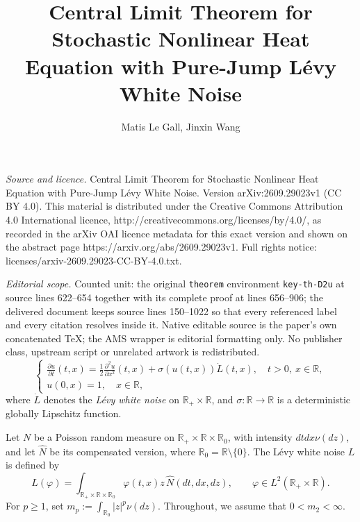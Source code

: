 \documentclass[10pt,a4paper]{amsart}
\def\bR{\mathbb{R}}
\begin{document}
\title[Central Limit Theorem for Stochastic Nonlinear Heat Equation]{Central Limit Theorem for Stochastic Nonlinear Heat Equation with Pure-Jump L\'evy White Noise}
\author{Matis Le Gall, Jinxin Wang}
\date{}
\maketitle
\noindent\emph{Source and licence.} Central Limit Theorem for Stochastic Nonlinear Heat Equation with Pure-Jump L\'evy White Noise. Version arXiv:2609.29023v1 (CC BY 4.0). This material is distributed under the Creative Commons Attribution 4.0 International licence, http://creativecommons.org/licenses/by/4.0/, as recorded in the arXiv OAI licence metadata for this exact version and shown on the abstract page https://arxiv.org/abs/2609.29023v1. Full rights notice: licenses/arxiv-2609.29023-CC-BY-4.0.txt.\par\smallskip
\noindent\textit{Editorial scope.} Counted unit: the original \texttt{theorem} environment \texttt{key-th-D2u} at source lines 622--654 together with its complete proof at lines 656--906; the delivered document keeps source lines 150--1022 so that every referenced label and every citation resolves inside it. Native editable source is the paper's own concatenated TeX; the AMS wrapper is editorial formatting only. No publisher class, upstream script or unrelated artwork is redistributed.
\begin{equation}
\label{nonlinear}
\begin{cases}
\displaystyle
\frac{\partial u}{\partial t}(t,x)
=
\frac{1}{2}\frac{\partial^2 u}{\partial x^2}(t,x)
+\sigma(u(t,x))\dot L(t,x),
\quad t>0,\ x\in\bR,\\[0.3em]
u(0,x)=1,\quad x\in\bR,
\end{cases}
\end{equation}
where $\dot L$ denotes the {\em L\'evy white noise} on
$\bR_+\times\bR$, and $\sigma:\bR\to\bR$ is a deterministic globally
Lipschitz function.


\medskip


 Let $N$ be a Poisson random measure on
$\bR_+\times\bR\times\bR_0$, with intensity $dtdx\nu(dz)$, and let
$\widehat N$ be its compensated version, where $\bR_0=\bR\setminus\{0\}$.
The L\'evy white noise $L$ is defined by
\begin{equation}
\label{def-L}
L(\varphi)
=
\int_{\bR_+\times\bR\times\bR_0}
\varphi(t,x)z\,
\widehat N(dt,dx,dz),
\qquad
\varphi\in L^2(\bR_+\times\bR).
\end{equation}
 For $p\ge1$, set $m_p:=\int_{\bR_0}|z|^p\nu(dz)$. Throughout, we
assume that $0<m_2<\infty$.
\end{document}
